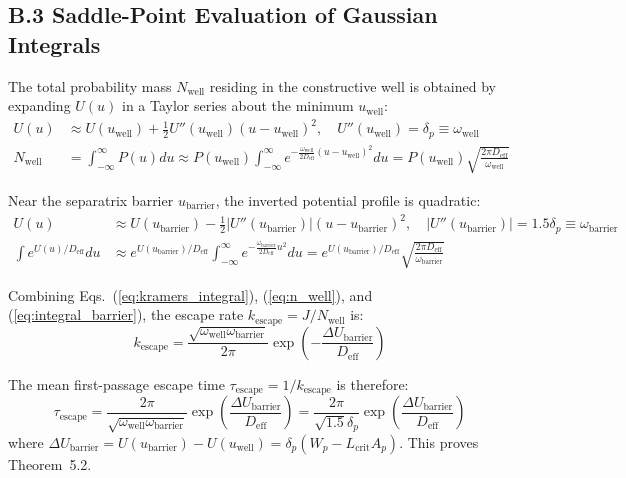 \documentclass[preprint,12pt,authoryear]{elsarticle}
\theoremstyle{definition}
\begin{document}
\subsection*{B.3 Saddle-Point Evaluation of Gaussian Integrals}

The total probability mass $N_{\text{well}}$ residing in the constructive well is obtained by expanding $U(u)$ in a Taylor series about the minimum $u_{\text{well}}$:
\begin{align}
U(u) &\approx U(u_{\text{well}}) + \frac{1}{2} U''(u_{\text{well}}) (u - u_{\text{well}})^2, \quad U''(u_{\text{well}}) = \delta_p \equiv \omega_{\text{well}} \label{eq:taylor_well} \\
N_{\text{well}} &= \int_{-\infty}^\infty P(u) du \approx P(u_{\text{well}}) \int_{-\infty}^\infty e^{-\frac{\omega_{\text{well}}}{2 D_{\text{eff}}} (u - u_{\text{well}})^2} du = P(u_{\text{well}}) \sqrt{\frac{2\pi D_{\text{eff}}}{\omega_{\text{well}}}} \label{eq:n_well}
\end{align}

Near the separatrix barrier $u_{\text{barrier}}$, the inverted potential profile is quadratic:
\begin{align}
U(u) &\approx U(u_{\text{barrier}}) - \frac{1}{2} |U''(u_{\text{barrier}})| (u - u_{\text{barrier}})^2, \quad |U''(u_{\text{barrier}})| = 1.5 \delta_p \equiv \omega_{\text{barrier}} \label{eq:taylor_barrier} \\
\int e^{U(u)/D_{\text{eff}}} du &\approx e^{U(u_{\text{barrier}})/D_{\text{eff}}} \int_{-\infty}^\infty e^{-\frac{\omega_{\text{barrier}}}{2 D_{\text{eff}}} u^2} du = e^{U(u_{\text{barrier}})/D_{\text{eff}}} \sqrt{\frac{2\pi D_{\text{eff}}}{\omega_{\text{barrier}}}} \label{eq:integral_barrier}
\end{align}

Combining Eqs.~(\ref{eq:kramers_integral}), (\ref{eq:n_well}), and (\ref{eq:integral_barrier}), the escape rate $k_{\text{escape}} = J / N_{\text{well}}$ is:
\begin{equation}
k_{\text{escape}} = \frac{\sqrt{\omega_{\text{well}} \omega_{\text{barrier}}}}{2\pi} \exp\left( -\frac{\Delta U_{\text{barrier}}}{D_{\text{eff}}} \right) \label{eq:k_escape}
\end{equation}

The mean first-passage escape time $\tau_{\text{escape}} = 1 / k_{\text{escape}}$ is therefore:
\begin{equation}
\tau_{\text{escape}} = \frac{2\pi}{\sqrt{\omega_{\text{well}} \omega_{\text{barrier}}}} \exp\left( \frac{\Delta U_{\text{barrier}}}{D_{\text{eff}}} \right) = \frac{2\pi}{\sqrt{1.5} \delta_p} \exp\left( \frac{\Delta U_{\text{barrier}}}{D_{\text{eff}}} \right) \label{eq:tau_escape_analytical}
\end{equation}
where $\Delta U_{\text{barrier}} = U(u_{\text{barrier}}) - U(u_{\text{well}}) = \delta_p (W_p - L_{\text{crit}} A_p)$. This proves Theorem~5.2.
\end{document}
